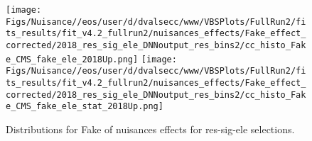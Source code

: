 


\begin{figure*}[htbp]  
\centering 
\texttt{[image: Figs/Nuisance//eos/user/d/dvalsecc/www/VBSPlots/FullRun2/fits\_results/fit\_v4.2\_fullrun2/nuisances\_effects/Fake\_effect\_corrected/2018\_res\_sig\_ele\_DNNoutput\_res\_bins2/cc\_histo\_Fake\_CMS\_fake\_ele\_2018Up.png]}
\texttt{[image: Figs/Nuisance//eos/user/d/dvalsecc/www/VBSPlots/FullRun2/fits\_results/fit\_v4.2\_fullrun2/nuisances\_effects/Fake\_effect\_corrected/2018\_res\_sig\_ele\_DNNoutput\_res\_bins2/cc\_histo\_Fake\_CMS\_fake\_ele\_stat\_2018Up.png]}
\\ 
\caption{ 
   Distributions for Fake of nuisances effects for res-sig-ele selections.
} 
\label{fig:Fake_res_sig_ele} 
\end{figure*} 



